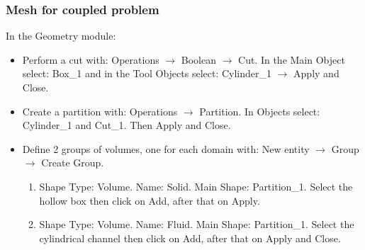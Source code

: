 \documentclass[10pt, hyperref={unicode=true,pdfusetitle, bookmarks=true,bookmarksnumbered=false,bookmarksopen=false, breaklinks=false,pdfborder={0 0 1},backref=true,colorlinks=true,linkcolor=darkblue,pageanchor}]{beamer}
\begin{document}
\begin{frame}
\frametitle{Mesh for coupled problem}

\begin{block}{In the Geometry module:}
\begin{itemize}

 \item Perform a cut with: Operations $\rightarrow$ Boolean $\rightarrow$ Cut. In the Main Object select: Box\_1 and in the Tool Objects select: Cylinder\_1 $\rightarrow$ Apply and Close.
 
 \item Create a partition with: Operations $\rightarrow$ Partition. In Objects select: Cylinder\_1 and Cut\_1. Then Apply and Close.

 \item Define 2 groups of volumes, one for each domain with: New entity $\rightarrow$ Group $\rightarrow$ Create Group.
 \begin{enumerate}
 \item  Shape Type: Volume. Name: Solid. Main Shape: Partition\_1. Select the hollow box then click on Add, after that on Apply.
 \item  Shape Type: Volume. Name: Fluid. Main Shape: Partition\_1. Select the cylindrical channel then click on Add, after that on Apply and Close.
 \end{enumerate}
 
\end{itemize}
 \end{block}

\end{frame}
\end{document}
